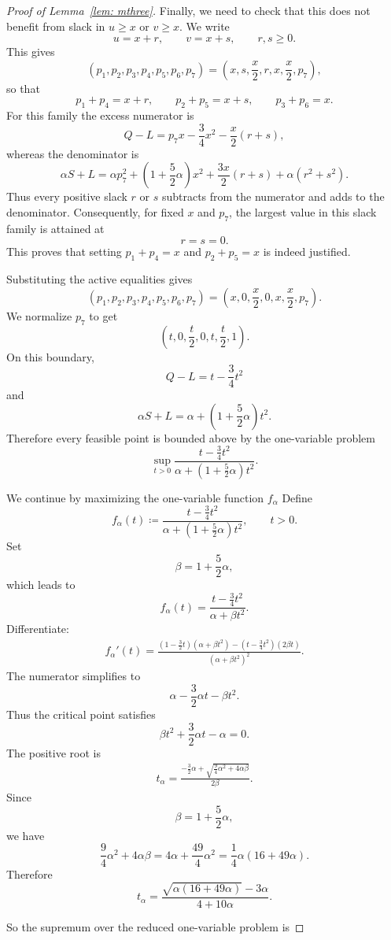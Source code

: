 \documentclass[%
english, titlepage=false %
]{./tum-templates/book/tumbook}
\begin{document}
\begin{proof}[\hypertarget{proof:mthree}{Proof of Lemma~\ref{lem: mthree}}]
Finally, we need to check that this does not benefit from slack in
\(u\ge x\) or \(v\ge x\). We write
\[
u=x+r,\qquad v=x+s,\qquad r,s\ge0.
\]
This gives
\[
(p_1,p_2,p_3,p_4,p_5,p_6,p_7)
=
\left(x,s,\frac{x}{2},r,x,\frac{x}{2},p_7\right),
\]
so that
\[
p_1+p_4=x+r,\qquad
p_2+p_5=x+s,\qquad
p_3+p_6=x.
\]
For this family the excess numerator is
\[
Q-L
=
p_7x-\frac34x^2-\frac{x}{2}(r+s),
\]
whereas the denominator is
\[
\alpha S+L
=
\alpha p_7^2
+\left(1+\frac52\alpha\right)x^2
+\frac{3x}{2}(r+s)
+\alpha(r^2+s^2).
\]
Thus every positive slack \(r\) or \(s\) subtracts from the numerator
and adds to the denominator. Consequently, for fixed \(x\) and \(p_7\),
the largest value in this slack family is attained at
\[
r=s=0.
\]
This proves that setting $p_1+p_4=x$ and $p_2+p_5=x$ is indeed justified.

Substituting the active equalities gives
\[
(p_1,p_2,p_3,p_4,p_5,p_6,p_7)
=
\left(x,0,\frac{x}{2},0,x,\frac{x}{2},p_7\right).
\]
We normalize \(p_7\) to get
\[
\left(t,0,\frac{t}{2},0,t,\frac{t}{2},1\right).
\]
On this boundary,
\[
Q-L=t-\frac34t^2
\]
and
\[
\alpha S+L
=
\alpha+\left(1+\frac52\alpha\right)t^2.
\]
Therefore every feasible point is bounded above by the one-variable
problem
\[
\sup_{t>0}
\frac{t-\frac34t^2}
{\alpha+\left(1+\frac52\alpha\right)t^2}.
\]

We continue by maximizing the one-variable function $f_{\alpha}$
Define
\[
f_\alpha(t)
\coloneqq
\frac{t-\frac34t^2}{\alpha+\left(1+\frac52\alpha\right)t^2},
\qquad t>0.
\]
Set
\[
\beta=1+\frac52\alpha,
\]
which leads to
\[
f_\alpha(t)=\frac{t-\frac34t^2}{\alpha+\beta t^2}.
\]
Differentiate:
\begin{align}
f_\alpha'(t)
=
\frac{
\left(1-\frac32t\right)(\alpha+\beta t^2)
-
\left(t-\frac34t^2\right)(2\beta t)
}{
(\alpha+\beta t^2)^2
} \label{Wolfram3}.
\end{align}
The numerator simplifies to
\[
\alpha-\frac32\alpha t-\beta t^2.
\]
Thus the critical point satisfies
\[
\beta t^2+\frac32\alpha t-\alpha=0.
\]
The positive root is
\begin{align}
\label{Wolfram4}
t_\alpha
=
\frac{
-\frac32\alpha+\sqrt{\frac94\alpha^2+4\alpha\beta}
}{
2\beta
}.
\end{align}
Since
\[
\beta=1+\frac52\alpha,
\]
we have
\[
\frac94\alpha^2+4\alpha\beta
=
4\alpha+\frac{49}{4}\alpha^2
=
\frac14\alpha(16+49\alpha).
\]
Therefore
\[
t_\alpha
=
\frac{\sqrt{\alpha(16+49\alpha)}-3\alpha}{4+10\alpha}.
\]

So the supremum over the reduced one-variable problem is


\end{proof}
\end{document}
